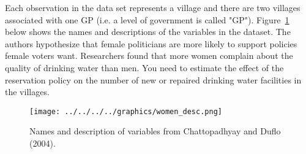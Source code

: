 \noindent Each observation in the data set represents a village and there are two villages associated with one GP (i.e. a level of government is called "GP"). Figure~\ref{fig:women_desc} below shows the names and descriptions of the variables in the dataset. The authors hypothesize that female politicians are more likely to support policies female voters want. Researchers found that more women complain about the quality of drinking water than men. You need to estimate the effect of the reservation policy on the number of new or repaired drinking water facilities in the villages.
\vspace{.5cm}
\begin{figure}[h!]
	\caption{\footnotesize{Names and description of variables from Chattopadhyay and Duflo (2004).}}
	\vspace{.5cm}
	\centering
	\label{fig:women_desc}
	\texttt{[image: ../../../../graphics/women\_desc.png]}
\end{figure}		

